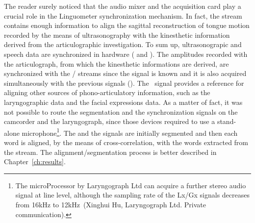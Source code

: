 The reader surely noticed that the audio mixer and the acquisition card play a
crucial role in the Linguometer synchronization mechanism.
In fact, the  stream contains enough information to align the sagittal
reconstruction of tongue motion recorded by the means of ultrasonography with 
the kinesthetic information derived from the articulographic investigation.
To sum up, ultrasonograpic and speech data are synchronized in hardware
( and ).
The amplitudes recorded with the articulograph, from which the kinesthetic
informations are derived, are synchronized with the /
streams since the  signal is known and it is also acquired
simultaneously with the previous signals ().
The~ signal provides a reference for aligning other sources of
phono-articulatory information, such as the laryngographic data and the facial
expressions data.
As a matter of fact, it was not possible to route the segmentation and the
synchronization signals on the camcorder and the laryngograph, since those
devices required to use a stand-alone microphone\footnote{The microProcessor by 
Laryngograph Ltd can acquire a
further stereo audio signal at line level, although the sampling rate of the
Lx/Gx signals decreases from 16kHz to 12kHz~(Xinghui Hu, Laryngograph Ltd.
Private communication).}.
The  and the  signals are initially segmented and
then each word is aligned, by the means of cross-correlation, with the words 
extracted from the  stream. The alignment/segmentation process
is better described in Chapter~\ref{ch:results}.
\pagebreak
